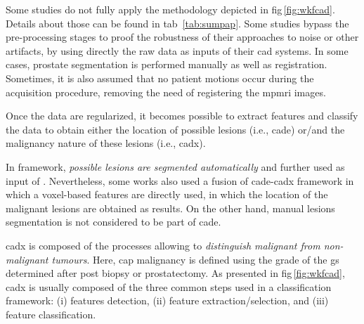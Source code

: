 Some studies do not fully apply the methodology depicted in \acs{fig}\,\ref{fig:wkfcad}.
Details about those can be found in \acs{tab}~\ref{tab:sumpap}.
Some studies bypass the pre-processing stages to proof the robustness of their approaches to noise or other artifacts, by using directly the raw data as inputs of their \ac{cad} systems.
In some cases, prostate segmentation is performed manually as well as registration.
Sometimes, it is also assumed that no patient motions occur during the acquisition procedure, removing the need of registering the \ac{mpmri} images.

Once the data are regularized, it becomes possible to extract features and classify the data to obtain either the location of possible lesions (i.e., \ac{cade}) or/and the malignancy nature of these lesions (i.e., \ac{cadx}).

In  framework, \textit{possible lesions are segmented automatically} and further used as input of .
Nevertheless, some works also used a fusion of \ac{cade}-\ac{cadx} framework in which a voxel-based features are directly used, in which the location of the malignant lesions are obtained as results.
On the other hand, manual lesions segmentation is not considered to be part of \ac{cade}.

\Ac{cadx} is composed of the processes allowing to \textit{distinguish malignant from non-malignant tumours}.
Here, \ac{cap} malignancy is defined using the grade of the \ac{gs} determined after post biopsy or prostatectomy.
As presented in \ac{fig}\,\ref{fig:wkfcad}, \ac{cadx} is usually composed of the three common steps used in a classification framework: (i) features detection, (ii) feature extraction/selection, and (iii) feature classification.



